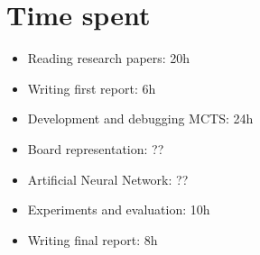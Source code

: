 \section{Time spent}
\begin{itemize}
	\item Reading research papers: 20h
	\item Writing first report: 6h
	\item Development and debugging MCTS: 24h
	\item Board representation: ??
	\item Artificial Neural Network: ??
	\item Experiments and evaluation: 10h
	\item Writing final report: 8h
\end{itemize}